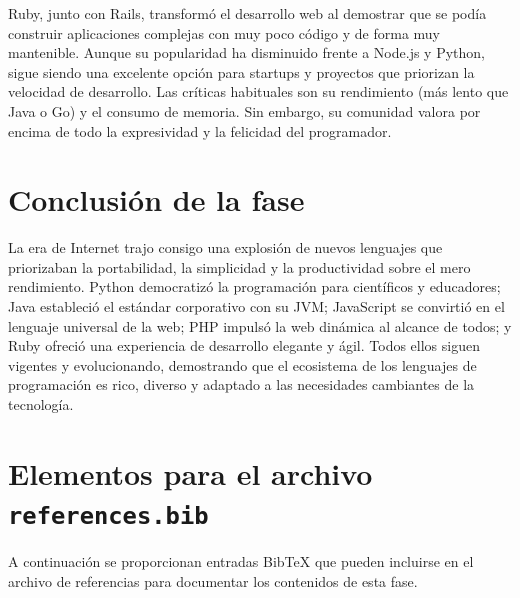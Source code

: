 Ruby, junto con Rails, transformó el desarrollo web al demostrar que se podía construir aplicaciones complejas con muy poco código y de forma muy mantenible. Aunque su popularidad ha disminuido frente a Node.js y Python, sigue siendo una excelente opción para startups y proyectos que priorizan la velocidad de desarrollo. Las críticas habituales son su rendimiento (más lento que Java o Go) y el consumo de memoria. Sin embargo, su comunidad valora por encima de todo la expresividad y la felicidad del programador.

\section{Conclusión de la fase}

La era de Internet trajo consigo una explosión de nuevos lenguajes que priorizaban la portabilidad, la simplicidad y la productividad sobre el mero rendimiento. Python democratizó la programación para científicos y educadores; Java estableció el estándar corporativo con su JVM; JavaScript se convirtió en el lenguaje universal de la web; PHP impulsó la web dinámica al alcance de todos; y Ruby ofreció una experiencia de desarrollo elegante y ágil. Todos ellos siguen vigentes y evolucionando, demostrando que el ecosistema de los lenguajes de programación es rico, diverso y adaptado a las necesidades cambiantes de la tecnología.

\section*{Elementos para el archivo \texttt{references.bib}}

A continuación se proporcionan entradas BibTeX que pueden incluirse en el archivo de referencias para documentar los contenidos de esta fase.
